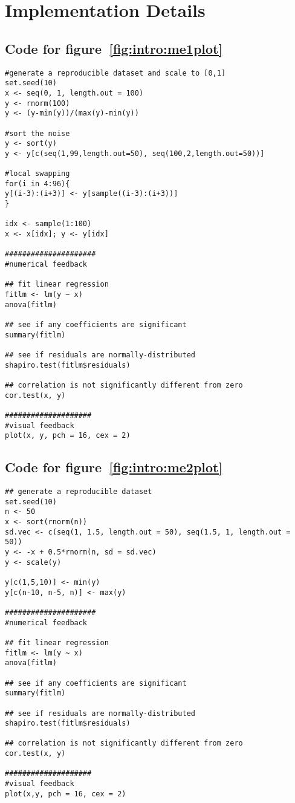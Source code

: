 \chapter{Implementation Details\label{ch:implementation}}

\lstset{basicstyle=\ttfamily,xleftmargin=0.5cm,breaklines=true}


\section{Code for figure~\ref{fig:intro:me1plot}}
\label{sec:appendicies:me1plot}
{
\begin{lstlisting}
#generate a reproducible dataset and scale to [0,1]
set.seed(10)
x <- seq(0, 1, length.out = 100)
y <- rnorm(100)
y <- (y-min(y))/(max(y)-min(y))

#sort the noise
y <- sort(y)
y <- y[c(seq(1,99,length.out=50), seq(100,2,length.out=50))]

#local swapping
for(i in 4:96){
y[(i-3):(i+3)] <- y[sample((i-3):(i+3))]
}

idx <- sample(1:100)
x <- x[idx]; y <- y[idx]

#####################
#numerical feedback

## fit linear regression
fitlm <- lm(y ~ x)
anova(fitlm)

## see if any coefficients are significant
summary(fitlm)

## see if residuals are normally-distributed
shapiro.test(fitlm$residuals)

## correlation is not significantly different from zero
cor.test(x, y)

####################
#visual feedback
plot(x, y, pch = 16, cex = 2)
\end{lstlisting}
}


\section{Code for figure~\ref{fig:intro:me2plot}}
\label{sec:appendicies:me2plot}
{
\begin{lstlisting}
## generate a reproducible dataset
set.seed(10)
n <- 50
x <- sort(rnorm(n))
sd.vec <- c(seq(1, 1.5, length.out = 50), seq(1.5, 1, length.out = 50))
y <- -x + 0.5*rnorm(n, sd = sd.vec)
y <- scale(y)

y[c(1,5,10)] <- min(y)
y[c(n-10, n-5, n)] <- max(y)

#####################
#numerical feedback

## fit linear regression
fitlm <- lm(y ~ x)
anova(fitlm)

## see if any coefficients are significant
summary(fitlm)

## see if residuals are normally-distributed
shapiro.test(fitlm$residuals) 

## correlation is not significantly different from zero
cor.test(x, y)

####################
#visual feedback
plot(x,y, pch = 16, cex = 2)
\end{lstlisting}
}


